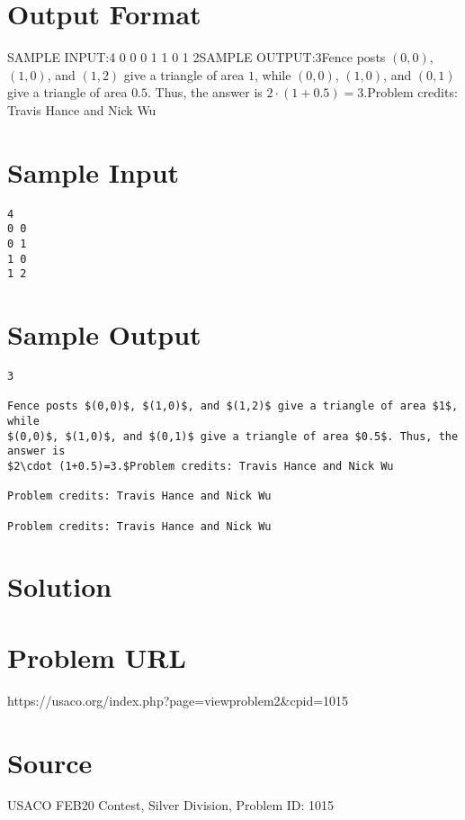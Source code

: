 \documentclass[12pt]{article}
\begin{document}
\section*{Output Format}
SAMPLE INPUT:4
0 0
0 1
1 0
1 2SAMPLE OUTPUT:3Fence posts $(0,0)$, $(1,0)$, and $(1,2)$ give a triangle of area $1$, while
$(0,0)$, $(1,0)$, and $(0,1)$ give a triangle of area $0.5$. Thus, the answer is
$2\cdot (1+0.5)=3.$Problem credits: Travis Hance and Nick Wu

\section*{Sample Input}
\begin{verbatim}
4
0 0
0 1
1 0
1 2
\end{verbatim}

\section*{Sample Output}
\begin{verbatim}
3

Fence posts $(0,0)$, $(1,0)$, and $(1,2)$ give a triangle of area $1$, while
$(0,0)$, $(1,0)$, and $(0,1)$ give a triangle of area $0.5$. Thus, the answer is
$2\cdot (1+0.5)=3.$Problem credits: Travis Hance and Nick Wu

Problem credits: Travis Hance and Nick Wu

Problem credits: Travis Hance and Nick Wu
\end{verbatim}

\section*{Solution}


\section*{Problem URL}
https://usaco.org/index.php?page=viewproblem2&cpid=1015

\section*{Source}
USACO FEB20 Contest, Silver Division, Problem ID: 1015
\end{document}
